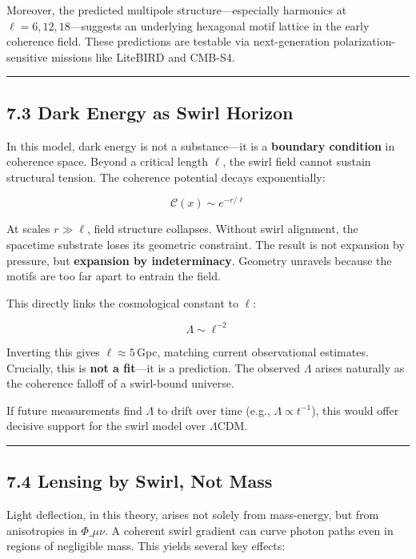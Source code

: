 \documentclass[
  11pt,
]{article}
\begin{document}
Moreover, the predicted multipole structure---especially harmonics at
\(\ell = 6, 12, 18\)---suggests an underlying hexagonal motif lattice in
the early coherence field. These predictions are testable via
next-generation polarization-sensitive missions like LiteBIRD and
CMB-S4.

\begin{center}\rule{0.5\linewidth}{0.5pt}\end{center}

\subsection{7.3 Dark Energy as Swirl
Horizon}\label{dark-energy-as-swirl-horizon}

In this model, dark energy is not a substance---it is a \textbf{boundary
condition} in coherence space. Beyond a critical length \(\ell\), the
swirl field cannot sustain structural tension. The coherence potential
decays exponentially:

\[
\mathcal{C}(x) \sim e^{-r/\ell}
\]

At scales \(r \gg \ell\), field structure collapses. Without swirl
alignment, the spacetime substrate loses its geometric constraint. The
result is not expansion by pressure, but \textbf{expansion by
indeterminacy}. Geometry unravels because the motifs are too far apart
to entrain the field.

This directly links the cosmological constant to \(\ell\):

\[
\Lambda \sim \ell^{-2}
\]

Inverting this gives \(\ell \approx 5\)\,Gpc, matching current
observational estimates. Crucially, this is \textbf{not a fit}---it is a
prediction. The observed \(\Lambda\) arises naturally as the coherence
falloff of a swirl-bound universe.

If future measurements find \(\Lambda\) to drift over time (e.g.,
\(\Lambda \propto t^{-1}\)), this would offer decisive support for the
swirl model over \(\Lambda\)CDM.

\begin{center}\rule{0.5\linewidth}{0.5pt}\end{center}

\subsection{7.4 Lensing by Swirl, Not
Mass}\label{lensing-by-swirl-not-mass}

Light deflection, in this theory, arises not solely from mass-energy,
but from anisotropies in \(\Phi\_{\mu\nu}\). A coherent swirl gradient
can curve photon paths even in regions of negligible mass. This yields
several key effects:
\end{document}
